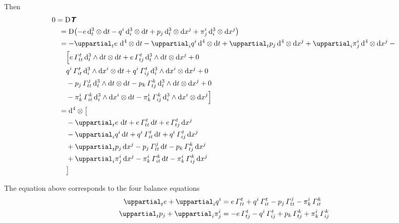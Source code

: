 \documentclass[\ifafour a4paper,12pt,\else a5paper,10pt,\fi%
onecolumn,oneside,article,%
british%
]{memoir}
\theoremstyle{remark}
\theoremstyle{innote}
\newcommand*{\mathte}[1]{\textbf{\textit{\textsf{#1}}}}
\newcommand*{\de}{\uppartial}%
\newcommand*{\di}{\mathrm{d}}%
\newcommand*{\Di}{\mathrm{D}}%
\renewcommand*{\|}[1][]{\nonscript\:#1\vert\nonscript\:\mathopen{}}
\newcommand*{\si}[1]{\di{#1}}
\newcommand*{\ttti}[1]{\di^{3}_{#1}}
\newcommand*{\tttti}[1]{\di^{4}_{#1}}
\newcommand*{\yT}{\mathte{T}}
\begin{document}
Then
\begin{equation}
  \label{eq:div_T31}
  \begin{aligned}
    &0=\Di\yT
    \\
    &\quad{}= \Di\bigl(
    -e\, \ttti{t}\otimes\si{t}
    -q^{i}\, \ttti{i}\otimes\si{t}
    +p_{j}\, \ttti{t}\otimes\si{x^{j}}
    +\pi^{i}_{j}\, \ttti{i}\otimes\si{x^{j}}
    \bigr)
    \\
    &\quad{}=
    -\de_{t}e\ \tttti{}\otimes\si{t}
    -\de_{i}q^{i}\, \tttti{}\otimes\si{t}
    +\de_{t}p_{j}\, \tttti{}\otimes\si{x^{j}}
    +\de_{i}\pi^{i}_{j}\, \tttti{}\otimes\si{x^{j}}
    -{}
    \\
    &\qquad
    \Bigl[
    e\,\varGamma^{t}_{tt}\, \ttti{t}\land\si{t} \otimes \si{t}
    +e\,\varGamma^{t}_{tj}\, \ttti{t}\land\si{t} \otimes \si{x^{j}}
    + 0
    \\
    &\qquad
    q^{i}\, \varGamma^{t}_{it}\, \ttti{i}\land\si{x^{i}} \otimes \si{t}
    +q^{i}\,\varGamma^{t}_{ij}\, \ttti{i}\land\si{x^{i}} \otimes \si{x^{j}}
    + 0
    \\
    &\qquad
    {}-p_{j}\, \varGamma^{j}_{tt}\, \ttti{t}\land\si{t} \otimes \si{t}
    -p_{k}\,\varGamma^{k}_{tj}\, \ttti{t}\land\si{t} \otimes \si{x^{j}}
    + 0
    \\
    &\qquad
    {}-\pi^{i}_{k}\, \varGamma^{k}_{it}\, \ttti{i}\land\si{x^{i}} \otimes \si{t}
    -\pi^{i}_{k}\,\varGamma^{k}_{ij}\, \ttti{i}\land\si{x^{i}} \otimes \si{x^{j}}
    \Bigr]
    \\
    &\quad{}=
    \tttti{}\otimes \bigl[{}
    \\
    &\qquad
    -\de_{t}e\ \si{t} 
    + e\,\varGamma^{t}_{tt}\, \si{t}
    +e\,\varGamma^{t}_{tj}\,  \si{x^{j}}
    \\
    &\qquad
    {}-\de_{i}q^{i}\, \si{t} 
    +q^{i}\, \varGamma^{t}_{it}\,  \si{t}
    +q^{i}\,\varGamma^{t}_{ij}\,  \si{x^{j}}
    \\
    &\qquad
    {}+\de_{t}p_{j}\, \si{x^{j}} 
    -p_{j}\, \varGamma^{j}_{tt}\, \si{t}
    -p_{k}\,\varGamma^{k}_{tj}\,  \si{x^{j}}
    \\
    &\qquad
    {}+\de_{i}\pi^{i}_{j}\, \si{x^{j}} 
    -\pi^{i}_{k}\, \varGamma^{k}_{it}\, \si{t}
    -\pi^{i}_{k}\,\varGamma^{k}_{ij}\, \si{x^{j}}
    \\
    &\qquad{}\bigr]
  \end{aligned}
\end{equation}

The equation above corresponds to the four balance equations
\begin{align}
  \label{eq:div_e}
  \de_{t}e + \de_{i}q^{i} &=
  e\,\varGamma^{t}_{tt}
  +q^{i}\, \varGamma^{t}_{it}
  -p_{j}\, \varGamma^{j}_{tt}
  -\pi^{i}_{k}\, \varGamma^{k}_{it}
  \\
  \label{eq:div_p}
  \de_{t}p_{j} +  \de_{i}\pi^{i}_{j} &=
  -e\,\varGamma^{t}_{tj}
  -q^{i}\,\varGamma^{t}_{ij}
  +p_{k}\,\varGamma^{k}_{tj}
  +\pi^{i}_{k}\,\varGamma^{k}_{ij}
\end{align}
\end{document}
